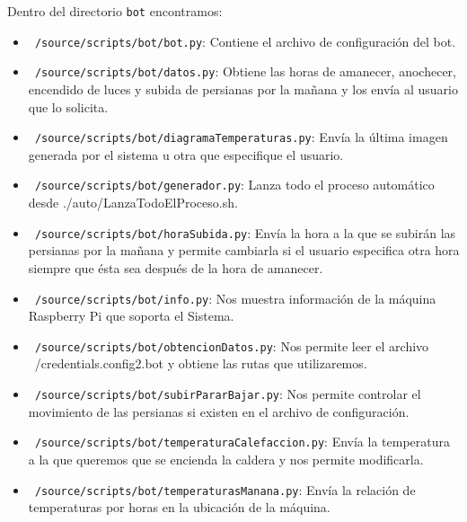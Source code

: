 Dentro del directorio \texttt{bot} encontramos:
\begin{itemize}
    \item \texttt{~/source/scripts/bot/bot.py}: Contiene el archivo de configuración del bot.
    \item \texttt{~/source/scripts/bot/datos.py}: Obtiene las horas de amanecer, anochecer, encendido de luces y subida de persianas por la mañana y los envía al usuario que lo solicita.
    \item \texttt{~/source/scripts/bot/diagramaTemperaturas.py}: Envía la última imagen generada por el sistema u otra que especifique el usuario.
    \item \texttt{~/source/scripts/bot/generador.py}: Lanza todo el proceso automático desde ./auto/LanzaTodoElProceso.sh.
    \item \texttt{~/source/scripts/bot/horaSubida.py}: Envía la hora a la que se subirán las persianas por la mañana y permite cambiarla si el usuario especifica otra hora siempre que ésta sea después de la hora de amanecer.
    \item \texttt{~/source/scripts/bot/info.py}: Nos muestra información de la máquina Raspberry Pi que soporta el Sistema.
    \item \texttt{~/source/scripts/bot/obtencionDatos.py}: Nos permite leer el archivo ~/credentials.config2.bot y obtiene las rutas que utilizaremos.
    \item \texttt{~/source/scripts/bot/subirPararBajar.py}: Nos permite controlar el movimiento de las persianas si existen en el archivo de configuración.
    \item \texttt{~/source/scripts/bot/temperaturaCalefaccion.py}: Envía la temperatura a la que queremos que se encienda la caldera y nos permite modificarla.
    \item \texttt{~/source/scripts/bot/temperaturasManana.py}: Envía la relación de temperaturas por horas en la ubicación de la máquina.
\end{itemize}

